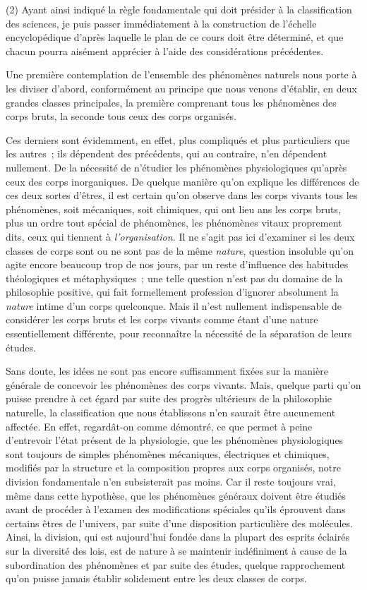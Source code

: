 \documentclass[french,twoside]{book} %
\begin{document}
(2) Ayant ainsi indiqué la règle fondamentale qui doit présider à la classification des sciences, je puis passer immédiatement à la construction de l’échelle encyclopédique d’après laquelle le plan de ce cours doit être déterminé, et que chacun pourra aisément apprécier à l’aide des considérations précédentes.\par
Une première contemplation de l’ensemble des phénomènes naturels nous porte à les diviser d’abord, conformément au principe que nous venons d’établir, en deux grandes classes principales, la première comprenant tous les phénomènes des corps bruts, la seconde tous ceux des corps organisés.\par
Ces derniers sont évidemment, en effet, plus compliqués et plus particuliers que les autres ; ils dépendent des précédents, qui au contraire, n’en dépendent nullement. De la nécessité de n’étudier les phénomènes physiologiques qu’après ceux des corps inorganiques. De quelque manière qu’on explique les différences de ces deux sortes d’êtres, il est certain qu’on observe dans les corps vivants tous les phénomènes, soit mécaniques, soit chimiques, qui ont lieu ans les corps bruts, plus un ordre tout spécial de phénomènes, les phénomènes vitaux proprement dits, ceux qui tiennent à {\itshape l’organisation.} Il ne s’agit pas ici d’examiner si les deux classes de corps sont ou ne sont pas de la même {\itshape nature}, question insoluble qu’on agite encore beaucoup trop de nos jours, par un reste d’influence des habitudes théologiques et métaphysiques ; une telle question n’est pas du domaine de la philosophie positive, qui fait formellement profession d’ignorer absolument la {\itshape nature} intime d’un corps quelconque. Mais il n’est nullement indispensable de considérer les corps bruts et les corps vivants comme étant d’une nature essentiellement différente, pour reconnaître la nécessité de la séparation de leurs études.\par
Sans doute, les idées ne sont pas encore suffisamment fixées sur la manière générale de concevoir les phénomènes des corps vivants. Mais, quelque parti qu’on puisse prendre à cet égard par suite des progrès ultérieurs de la philosophie naturelle, la classification que nous établissons n’en saurait être aucunement affectée. En effet, regardât-on comme démontré, ce que permet à peine d’entrevoir l’état présent de la physiologie, que les phénomènes physiologiques sont toujours de simples phénomènes mécaniques, électriques et chimiques, modifiés par la structure et la composition propres aux corps organisés, notre division fondamentale n’en subsisterait pas moins. Car il reste toujours vrai, même dans cette hypothèse, que les phénomènes généraux doivent être étudiés avant de procéder à l’examen des modifications spéciales qu’ils éprouvent dans certains êtres de l’univers, par suite d’une disposition particulière des molécules. Ainsi, la division, qui est aujourd’hui fondée dans la plupart des esprits éclairés sur la diversité des lois, est de nature à se maintenir indéfiniment à cause de la subordination des phénomènes et par suite des études, quelque rapprochement qu’on puisse jamais établir solidement entre les deux classes de corps.\par
\end{document}
